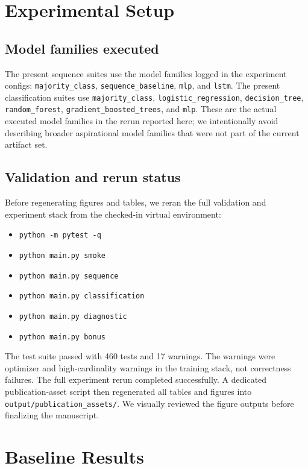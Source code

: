 \documentclass[11pt]{article}
\begin{document}
\section{Experimental Setup}

\subsection{Model families executed}

The present sequence suites use the model families logged in the experiment configs: \texttt{majority\_class}, \texttt{sequence\_baseline}, \texttt{mlp}, and \texttt{lstm}. The present classification suites use \texttt{majority\_class}, \texttt{logistic\_regression}, \texttt{decision\_tree}, \texttt{random\_forest}, \texttt{gradient\_boosted\_trees}, and \texttt{mlp}. These are the actual executed model families in the rerun reported here; we intentionally avoid describing broader aspirational model families that were not part of the current artifact set.

\subsection{Validation and rerun status}

Before regenerating figures and tables, we reran the full validation and experiment stack from the checked-in virtual environment:

\begin{itemize}
  \item \texttt{python -m pytest -q}
  \item \texttt{python main.py smoke}
  \item \texttt{python main.py sequence}
  \item \texttt{python main.py classification}
  \item \texttt{python main.py diagnostic}
  \item \texttt{python main.py bonus}
\end{itemize}

The test suite passed with 460 tests and 17 warnings. The warnings were optimizer and high-cardinality warnings in the training stack, not correctness failures. The full experiment rerun completed successfully. A dedicated publication-asset script then regenerated all tables and figures into \texttt{output/publication\_assets/}. We visually reviewed the figure outputs before finalizing the manuscript.

\section{Baseline Results}
\end{document}
